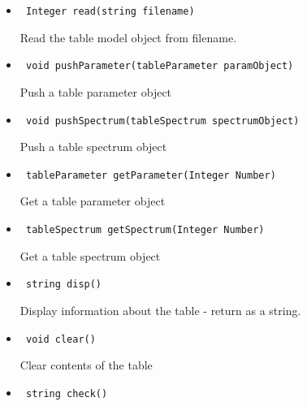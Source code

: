 \documentclass[11pt]{book}
\begin{document}
\begin{itemize}

\item    \begin{verbatim} Integer read(string filename) \end{verbatim}
            
            Read the table model object from filename.

\item    \begin{verbatim} void pushParameter(tableParameter paramObject) \end{verbatim}
            
            Push a table parameter object

\item    \begin{verbatim} void pushSpectrum(tableSpectrum spectrumObject) \end{verbatim}
            
            Push a table spectrum object

\item    \begin{verbatim} tableParameter getParameter(Integer Number) \end{verbatim}
            
            Get a table parameter object

\item    \begin{verbatim} tableSpectrum getSpectrum(Integer Number) \end{verbatim}
            
            Get a table spectrum object

\item    \begin{verbatim} string disp() \end{verbatim}

            Display information about the table - return as a string.

\item    \begin{verbatim} void clear() \end{verbatim}

            Clear contents of the table

\item    \begin{verbatim} string check() \end{verbatim}


\end{itemize}
\end{document}
